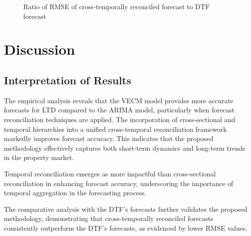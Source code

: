 \documentclass[
  11pt,
  a4paper,
]{article}
\begin{document}
\begin{figure}


\caption{\label{fig-rmseratio}Ratio of RMSE of cross-temporally
reconciled forecast to DTF forecast}

\end{figure}%

\section{Discussion}\label{discussion}

\subsection{Interpretation of Results}\label{interpretation-of-results}

The empirical analysis reveals that the VECM model provides more
accurate forecasts for LTD compared to the ARIMA model, particularly
when forecast reconciliation techniques are applied. The incorporation
of cross-sectional and temporal hierarchies into a unified
cross-temporal reconciliation framework markedly improves forecast
accuracy. This indicates that the proposed methodology effectively
captures both short-term dynamics and long-term trends in the property
market.

Temporal reconciliation emerges as more impactful than cross-sectional
reconciliation in enhancing forecast accuracy, underscoring the
importance of temporal aggregation in the forecasting process.

The comparative analysis with the DTF's forecasts further validates the
proposed methodology, demonstrating that cross-temporally reconciled
forecasts consistently outperform the DTF's forecasts, as evidenced by
lower RMSE values.
\end{document}
